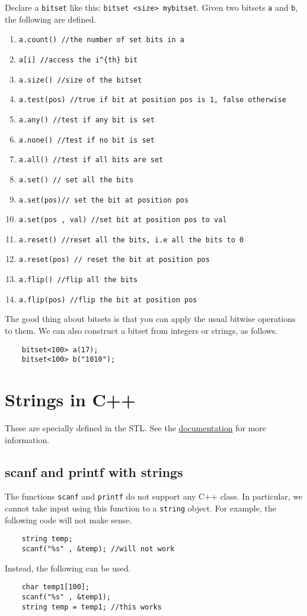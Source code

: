 \documentclass[12pt,a4paper]{amsart}
\numberwithin{equation}{section}
\theoremstyle{definition}
\begin{document}
Declare a \verb|bitset| like this: \verb|bitset <size> mybitset|. Given two bitsets \verb|a| and \verb|b|, the following are defined. 
\begin{enumerate}
    \item \verb|a.count() //the number of set bits in a|
    \item \verb|a[i] //access the i^{th} bit|
    \item \verb|a.size() //size of the bitset|
    \item \verb|a.test(pos) //true if bit at position pos is 1, false otherwise|
    \item \verb|a.any() //test if any bit is set|
    \item \verb|a.none() //test if no bit is set|
    \item \verb|a.all() //test if all bits are set|
    \item \verb|a.set() // set all the bits|
    \item \verb|a.set(pos)// set the bit at position pos|
    \item \verb|a.set(pos , val) //set bit at position pos to val|
    \item \verb|a.reset() //reset all the bits, i.e all the bits to 0|
    \item \verb|a.reset(pos) // reset the bit at position pos|
    \item \verb|a.flip() //flip all the bits|
    \item \verb|a.flip(pos) //flip the bit at position pos|
\end{enumerate}

The good thing about bitsets is that you can apply the usual bitwise operations to them. We can also construct a bitset from integers or strings, as follows. 
\begin{lstlisting}
    bitset<100> a(17);
    bitset<100> b("1010");
\end{lstlisting}

\section{Strings in C++} 
\noindent These are specially defined in the STL. See the \href{http://www.cplusplus.com/reference/string/string/}{documentation} for more information. 

\subsection{scanf and printf with strings} The functions \verb|scanf| and \verb|printf| do not support any C++ class. In particular, we cannot take input using this function to a \verb|string| object. For example, the following code will not make sense.
\begin{lstlisting}
    string temp;
    scanf("%s" , &temp); //will not work
\end{lstlisting}
Instead, the following can be used. 
\begin{lstlisting}
    char temp1[100];
    scanf("%s" , &temp1);
    string temp = temp1; //this works
\end{lstlisting}
\end{document}
